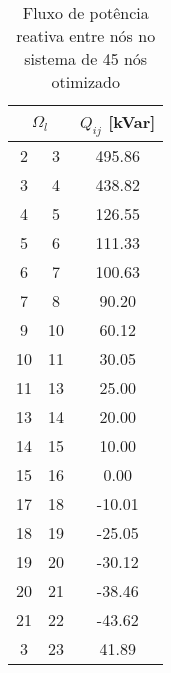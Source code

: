 \begin{table}[H]\footnotesize
    \caption{Fluxo de potência reativa entre nós no sistema de 45 nós otimizado}
    \label{tab:fluxo_kvar_otim}
    \begin{minipage}{.5\linewidth}
        \centering
        \begin{tabular}{|c|c|c|}
            \hline
            \multicolumn{2}{|c|}{$\Omega_l$} & $Q_{ij}$ [kVar]  \\ \hline
             2 &   3 &  495.86\\ \hline
             3 &   4 &  438.82\\ \hline
             4 &   5 &  126.55\\ \hline
             5 &   6 &  111.33\\ \hline
             6 &   7 &  100.63\\ \hline
             7 &   8 &   90.20\\ \hline
             9 &  10 &   60.12\\ \hline
            10 &  11 &   30.05\\ \hline
            11 &  13 &   25.00\\ \hline
            13 &  14 &   20.00\\ \hline
            14 &  15 &   10.00\\ \hline
            15 &  16 &    0.00\\ \hline
            17 &  18 &  -10.01\\ \hline
            18 &  19 &  -25.05\\ \hline
            19 &  20 &  -30.12\\ \hline
            20 &  21 &  -38.46\\ \hline
            21 &  22 &  -43.62\\ \hline
             3 &  23 &   41.89\\ \hline


\end{tabular}
\end{minipage}
\end{table}
